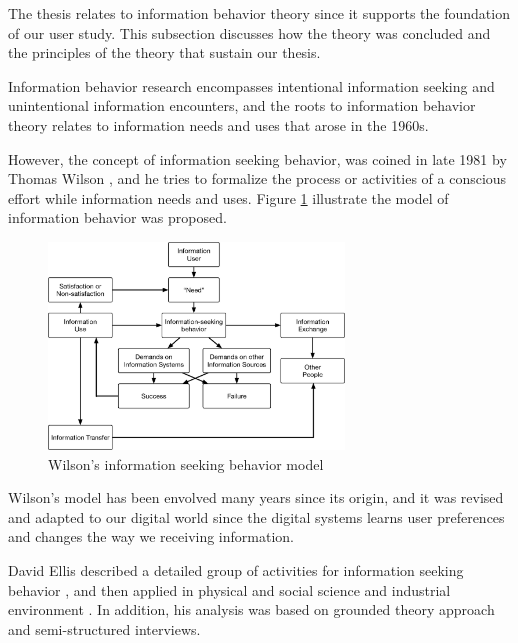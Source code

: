 The thesis relates to information behavior theory since it supports the foundation of our
user study. This subsection discusses how the theory was concluded and 
the principles of the theory that sustain our thesis.

Information behavior research encompasses intentional information seeking and 
unintentional information encounters, and the roots to information behavior 
theory relates to information needs and uses \cite{doi:10.1002/aris.2009.1440430114} 
that arose in the 1960s.

However, the concept of information seeking behavior, was coined in late 1981 
by Thomas Wilson \cite{wilson1981user}, and he tries to formalize the process or 
activities of a conscious effort while information needs 
and uses. Figure \ref{fig:wilson-info-seek} illustrate the model of information behavior 
was proposed.

\begin{figure}[H]
    \centering
    \includegraphics[width=0.7\textwidth]{figures/wilson-info-behavior}
    \caption{Wilson's information seeking behavior model \cite{wilson1981user}}
    \label{fig:wilson-info-seek}
\end{figure}

Wilson's model has been envolved many years since its origin, and it was revised 
and adapted to our digital world since the digital systems learns user preferences and 
changes \cite{giannini1998receiving} the way we receiving information.

David Ellis described a detailed group of activities for information seeking behavior \cite{ellis1989behavioural},
and then applied in physical and social science \cite{ellis1993comparison} and industrial
environment \cite{ellis1997modelling}.
In addition, his analysis was
based on grounded theory approach \cite{aceto1994grounded} and semi-structured interviews. 

